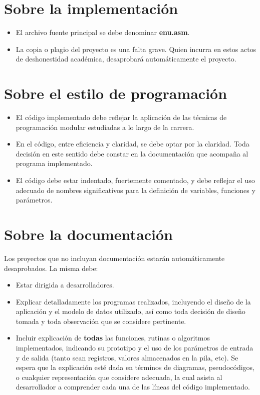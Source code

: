 \documentclass[12pt,a4paper]{article}
\begin{document}
\section*{Sobre la implementación}
\begin{itemize}
	
	\item El archivo fuente principal se debe denominar \textbf{\textsf{enu.asm}}.
	
	\item La copia o plagio del proyecto es una falta grave. Quien incurra en estos actos de deshonestidad académica, desaprobará automáticamente el proyecto.
\end{itemize}

\section*{Sobre el estilo de programación}
\begin{itemize}
		
	\item El código implementado debe reflejar la aplicación de las técnicas de programación modular estudiadas a lo largo de la carrera.
	
	\item En el código, entre eficiencia y claridad, se debe optar por la claridad. Toda decisión en este sentido debe constar en la documentación que acompaña al programa implementado.
	
	\item El código debe estar indentado, fuertemente comentado, y debe reflejar el uso adecuado de nombres significativos para la definición de variables, funciones y parámetros.
	
\end{itemize}

\section*{Sobre la documentación}

Los proyectos que no incluyan documentación estarán automáticamente desaprobados. La misma debe:
\begin{itemize}
	
	\item Estar dirigida a desarrolladores.
	
	\item Explicar detalladamente los programas realizados, incluyendo el diseño de la aplicación y el modelo de datos utilizado, así como toda decisión de diseño tomada y toda observación que se considere pertinente.
	
	\item Incluir explicación de \textbf{todas} las funciones, rutinas o algoritmos implementados, indicando su prototipo y el uso de los parámetros de entrada y de salida (tanto sean registros, valores almacenados en la pila, etc). Se espera que la explicación esté dada en términos de diagramas, pseudocódigos, o cualquier representación que considere adecuada, la cual asista al desarrollador a comprender cada una de las líneas del código implementado.
	
\end{itemize}
\end{document}
